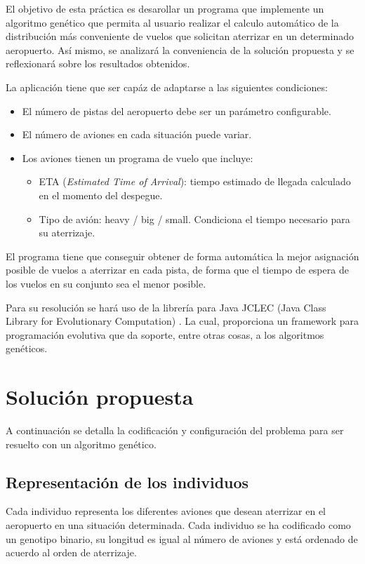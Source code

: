 \documentclass[a4paper,12pt,titlepage]{article}
\begin{document}
El objetivo de esta práctica es desarollar un programa que implemente un algoritmo genético que permita al usuario realizar el calculo automático de la distribución
más conveniente de vuelos que solicitan aterrizar en un determinado aeropuerto. Así mismo, se analizará la conveniencia de la solución propuesta y se reflexionará sobre los resultados obtenidos.

La aplicación tiene que ser capáz de adaptarse a las siguientes condiciones:

\begin{itemize}[noitemsep]
	\item El número de pistas del aeropuerto debe ser un parámetro configurable.
	\item El número de aviones en cada situación puede variar.
	\item Los aviones tienen un programa de vuelo que incluye:
	\begin{itemize}[noitemsep]
		\item ETA (\textit{Estimated Time of Arrival}): tiempo estimado de llegada calculado en el momento del despegue.
		\item Tipo de avión: heavy / big / small. Condiciona el tiempo necesario para su aterrizaje.
	\end{itemize}
\end{itemize}

El programa tiene que conseguir obtener de forma automática la mejor asignación posible de vuelos a aterrizar en cada pista, de forma que el tiempo de espera de los vuelos en su conjunto sea el menor posible.

Para su resolución se hará uso de la librería para Java JCLEC (Java Class Library for Evolutionary Computation) \citep{web:jclec}. La cual, proporciona un framework para programación evolutiva que da soporte, entre otras cosas, a los algoritmos genéticos.

\section{Solución propuesta}

A continuación se detalla la codificación y configuración del problema para ser resuelto con un algoritmo genético.

\subsection{Representación de los individuos}

Cada individuo representa los diferentes aviones que desean aterrizar en el aeropuerto en una situación determinada. Cada individuo se ha codificado como un genotipo binario, su longitud es igual al número de aviones y está ordenado de acuerdo al orden de aterrizaje. 
\end{document}
